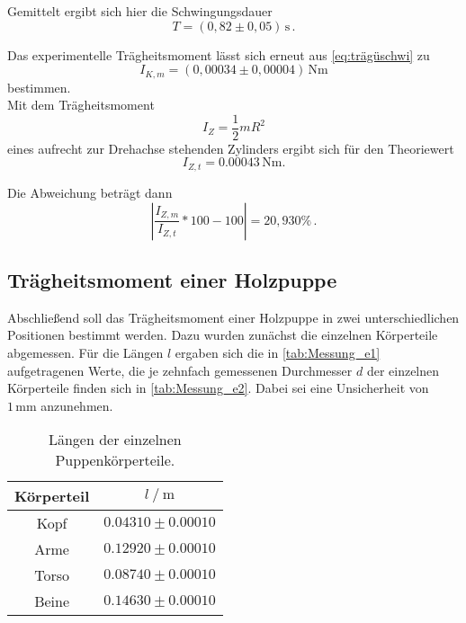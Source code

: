Gemittelt ergibt sich hier die Schwingungsdauer
\begin{equation*}
  T = (0,82 \pm 0,05) \, \unit{\second} \,.
\end{equation*}

Das experimentelle Trägheitsmoment lässt sich erneut aus \eqref{eq:trägüschwi} zu
\begin{equation*}
  I_{K,m} = (0,00034 \pm 0,00004) \, \unit{\newton\meter}
\end{equation*} 
bestimmen. \\

Mit dem Trägheitsmoment
\begin{equation}
  I_Z = \frac{1}{2} m R^2
\end{equation}
eines aufrecht zur Drehachse stehenden Zylinders ergibt sich für den Theoriewert
\begin{equation*}
  I_{Z,t} = 0.00043 \,  \unit{\newton\meter}.
\end{equation*}

Die Abweichung beträgt dann
\begin{equation*}
  \left|\frac{I_{Z,m}}{I_{Z,t}} * 100 - 100 \right| = 20,930 \% \,.
\end{equation*}

\newpage

\subsection{Trägheitsmoment einer Holzpuppe}
\label{subsec:e}

Abschließend soll das Trägheitsmoment einer Holzpuppe in zwei unterschiedlichen Positionen bestimmt werden. Dazu wurden zunächst die einzelnen Körperteile abgemessen.
Für die Längen $l$ ergaben sich die in \autoref{tab:Messung_e1} aufgetragenen Werte, die je zehnfach gemessenen Durchmesser $d$ der einzelnen Körperteile finden sich in \autoref{tab:Messung_e2}.
Dabei sei eine Unsicherheit von $1 \, \unit{\milli\meter}$ anzunehmen.

\begin{table}[H]
  \centering
  \begin{tabular}{S[table-format=2.0] S[table-format=2.2]}
      \toprule
      {Körperteil} & {$l \mathbin{/} \unit{\meter}$}\\
      \midrule
        {Kopf}  & {$0.04310 \pm 0.00010$} \\
        {Arme}  & {$0.12920 \pm 0.00010$} \\
        {Torso} & {$0.08740 \pm 0.00010$} \\
        {Beine} & {$0.14630 \pm 0.00010$} \\
      \bottomrule
  \end{tabular}
  \caption{Längen der einzelnen Puppenkörperteile.}
  \label{tab:Messung_e1}
\end{table}

